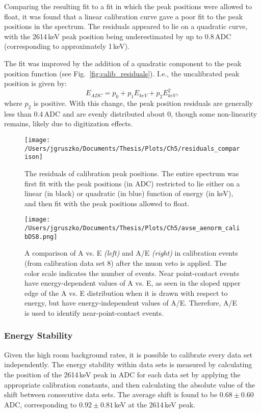 Comparing the resulting fit to a fit in which the peak positions were allowed to float, it was found that a linear calibration curve gave a poor fit to the peak positions in the spectrum. The residuals appeared to lie on a quadratic curve, with the 2614\,keV peak position being underestimated by up to 0.8\,ADC (corresponding to approximately 1\,keV). 

The fit was improved by the addition of a quadratic component to the peak position function (see Fig.~\ref{fig:calib_residuals}). I.e., the uncalibrated peak position is given by:
$$E_{ADC} = p_0 + p_1E_{keV} + p_2E_{keV}^2,$$
where $p_2$ is positive. With this change, the peak position residuals are generally less than 0.4\,ADC and are evenly distributed about 0, though some non-linearity remains, likely due to digitization effects. 

\begin{figure*}[]

 \centering
 \texttt{[image: /Users/jgruszko/Documents/Thesis/Plots/Ch5/residuals\_comparison]}
 \caption[The residuals of calibration peak positions]{The residuals of calibration peak positions. The entire spectrum was first fit with the peak positions (in ADC) restricted to lie either on a linear (in black) or quadratic (in blue) function of energy (in keV), and then fit with the peak positions allowed to float.} 
 \label{fig:calib_residuals}

 \centering
 \texttt{[image: /Users/jgruszko/Documents/Thesis/Plots/Ch5/avse\_aenorm\_calibDS8.png]}
 \caption[A comparison of A vs. E and A/E in calibration events]{A comparison of A vs. E {\it (left)} and A/E {\it (right)} in calibration events (from calibration data set 8) after the muon veto is applied. The color scale indicates the number of events. Near point-contact events have energy-dependent values of A vs. E, as seen in the sloped upper edge of the A vs. E distribution when it is drawn with respect to energy, but have energy-independent values of A/E. Therefore, A/E is used to identify near-point-contact events.} 
 \label{fig:avse_aenorm_comparison}
\end{figure*}

\subsubsection{Energy Stability}
Given the high room background rates, it is possible to calibrate every data set independently. The energy stability within data sets is measured by calculating the position of the 2614\,keV peak in ADC for each data set by applying the appropriate calibration constants, and then calculating the absolute value of the shift between consecutive data sets. The average shift is found to be $0.68\pm0.60$\,ADC, corresponding to $0.92\pm0.81$\,keV at the 2614\,keV peak. 

